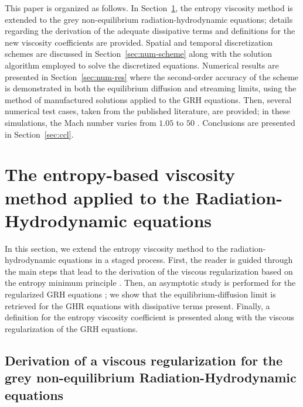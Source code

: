 \documentclass[review]{elsarticle}
\newcommand{\sect}[1]{Section~\ref{#1}}                     %
\begin{document}
This paper is organized as follows. In \sect{sec:entropy-visc-meth}, the entropy viscosity method is extended to the grey non-equilibrium radiation-hydrodynamic equations;  details regarding the derivation of the adequate dissipative terms and definitions for the new viscosity coefficients are provided. Spatial and temporal discretization schemes are discussed in \sect{sec:num-scheme} along with the solution algorithm employed to solve the discretized equations. Numerical results are presented in \sect{sec:num-res} where the second-order accuracy of the scheme is demonstrated in both the equilibrium diffusion and streaming limits, using the method of manufactured solutions applied to the GRH equations. Then, several numerical test cases, taken from the published literature, are provided; in these simulations, the Mach number varies from $1.05$ to $50$ \cite{LowrieEdwards}. Conclusions are presented in \sect{sec:ccl}.

\section{The entropy-based viscosity method applied to the Radiation-Hydrodynamic equations}
\label{sec:entropy-visc-meth}

In this section, we extend the entropy viscosity method \cite{jlg1, jlg2, valentin} to the radiation-hydrodynamic equations in a staged process. First, the reader is guided through the main steps that lead to the derivation of the viscous regularization based on the entropy minimum principle \cite{entropy}. Then, an asymptotic study is performed for the regularized GRH equations ; we show that the equilibrium-diffusion limit \cite{LowrieMorel} is retrieved for the GHR equations with dissipative terms present. Finally, a definition for the entropy viscosity coefficient is presented along with the viscous regularization of the GRH equations.
 
\subsection{Derivation of a viscous regularization for the grey non-equilibrium Radiation-Hydrodynamic equations}\label{sec:visc-reg}
\end{document}
